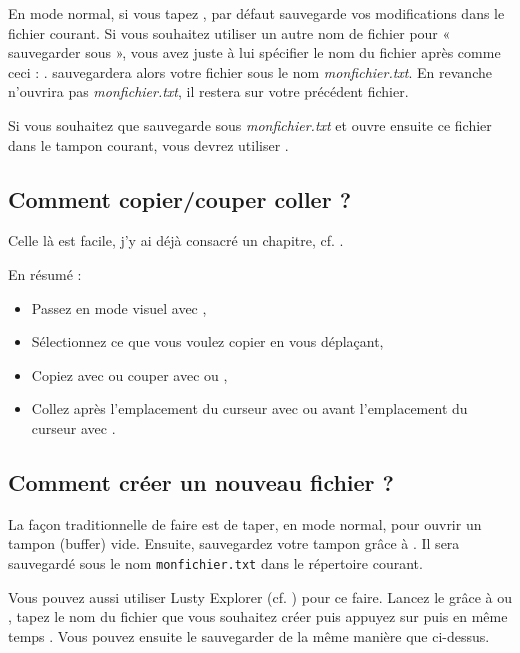En mode normal, si vous tapez , \vim par défaut sauvegarde vos modifications dans le fichier courant. Si vous souhaitez utiliser un autre nom de fichier pour « sauvegarder sous », vous avez juste à lui spécifier le nom du fichier après  comme ceci : . \vim sauvegardera alors votre fichier sous le nom \emph{monfichier.txt}. En revanche \vim n'ouvrira pas \emph{monfichier.txt}, il restera sur votre précédent fichier.

Si vous souhaitez que \vim sauvegarde sous \emph{monfichier.txt} et ouvre ensuite ce fichier dans le tampon courant, vous devrez utiliser .

\subsection{Comment copier/couper coller ?}

Celle là est facile, j'y ai déjà consacré un chapitre, cf. . 

En résumé :

\begin{itemize}
    \item Passez en mode visuel avec \ttv,
    \item Sélectionnez ce que vous voulez copier en vous déplaçant,
    \item Copiez avec \tty\xspace ou couper avec \ttx ou \ttd,
    \item Collez après l'emplacement du curseur avec \ttp ou avant l'emplacement du curseur avec \ttP.
\end{itemize}

\subsection{Comment créer un nouveau fichier ?}

La façon traditionnelle de faire est de taper, en mode normal,  pour ouvrir un tampon (buffer) vide. Ensuite, sauvegardez votre tampon grâce à . Il sera sauvegardé sous le nom \Verb|monfichier.txt| dans le répertoire courant.

Vous pouvez aussi utiliser Lusty Explorer (cf. ) pour ce faire. Lancez le grâce à  ou , tapez le nom du fichier que vous souhaitez créer puis appuyez sur \ttctrl puis en même temps \tte. Vous pouvez ensuite le sauvegarder de la même manière que ci-dessus.

